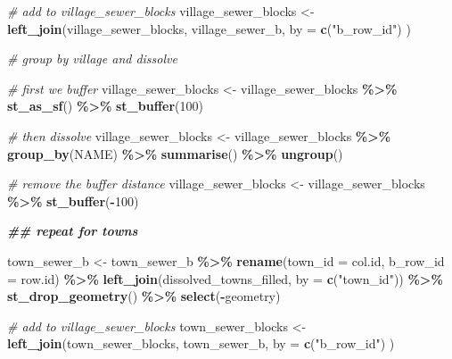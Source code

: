 \documentclass[
]{book}
\newenvironment{Shaded}{\begin{snugshade}}{\end{snugshade}}
\newcommand{\AttributeTok}[1]{\textcolor[rgb]{0.13,0.29,0.53}{#1}}
\newcommand{\CommentTok}[1]{\textcolor[rgb]{0.56,0.35,0.01}{\textit{#1}}}
\newcommand{\DecValTok}[1]{\textcolor[rgb]{0.00,0.00,0.81}{#1}}
\newcommand{\DocumentationTok}[1]{\textcolor[rgb]{0.56,0.35,0.01}{\textbf{\textit{#1}}}}
\newcommand{\FunctionTok}[1]{\textcolor[rgb]{0.13,0.29,0.53}{\textbf{#1}}}
\newcommand{\NormalTok}[1]{#1}
\newcommand{\OtherTok}[1]{\textcolor[rgb]{0.56,0.35,0.01}{#1}}
\newcommand{\SpecialCharTok}[1]{\textcolor[rgb]{0.81,0.36,0.00}{\textbf{#1}}}
\newcommand{\StringTok}[1]{\textcolor[rgb]{0.31,0.60,0.02}{#1}}
\begin{document}
\begin{Shaded}
\begin{Highlighting}[]
\CommentTok{\# add to village\_sewer\_blocks}
\NormalTok{village\_sewer\_blocks }\OtherTok{\textless{}{-}} \FunctionTok{left\_join}\NormalTok{(village\_sewer\_blocks, village\_sewer\_b, }
                                  \AttributeTok{by =} \FunctionTok{c}\NormalTok{(}\StringTok{"b\_row\_id"}\NormalTok{)}
\NormalTok{                                  )}

\CommentTok{\# group by village and dissolve}

\CommentTok{\# first we buffer}
\NormalTok{village\_sewer\_blocks }\OtherTok{\textless{}{-}}\NormalTok{ village\_sewer\_blocks }\SpecialCharTok{\%\textgreater{}\%}
  \FunctionTok{st\_as\_sf}\NormalTok{() }\SpecialCharTok{\%\textgreater{}\%}
  \FunctionTok{st\_buffer}\NormalTok{(}\DecValTok{100}\NormalTok{)}

\CommentTok{\# then dissolve}
\NormalTok{village\_sewer\_blocks }\OtherTok{\textless{}{-}}\NormalTok{ village\_sewer\_blocks }\SpecialCharTok{\%\textgreater{}\%} 
  \FunctionTok{group\_by}\NormalTok{(NAME) }\SpecialCharTok{\%\textgreater{}\%}
  \FunctionTok{summarise}\NormalTok{() }\SpecialCharTok{\%\textgreater{}\%}
  \FunctionTok{ungroup}\NormalTok{()}

\CommentTok{\# remove the buffer distance}
\NormalTok{village\_sewer\_blocks }\OtherTok{\textless{}{-}}\NormalTok{ village\_sewer\_blocks }\SpecialCharTok{\%\textgreater{}\%}
  \FunctionTok{st\_buffer}\NormalTok{(}\SpecialCharTok{{-}}\DecValTok{100}\NormalTok{)}

\DocumentationTok{\#\# repeat for towns}

\NormalTok{town\_sewer\_b }\OtherTok{\textless{}{-}}\NormalTok{ town\_sewer\_b }\SpecialCharTok{\%\textgreater{}\%}
  \FunctionTok{rename}\NormalTok{(}\AttributeTok{town\_id =}\NormalTok{ col.id,}
         \AttributeTok{b\_row\_id =}\NormalTok{ row.id) }\SpecialCharTok{\%\textgreater{}\%}
  \FunctionTok{left\_join}\NormalTok{(dissolved\_towns\_filled, }\AttributeTok{by =} \FunctionTok{c}\NormalTok{(}\StringTok{"town\_id"}\NormalTok{)) }\SpecialCharTok{\%\textgreater{}\%}
  \FunctionTok{st\_drop\_geometry}\NormalTok{() }\SpecialCharTok{\%\textgreater{}\%}
  \FunctionTok{select}\NormalTok{(}\SpecialCharTok{{-}}\NormalTok{geometry)}

\CommentTok{\# add to village\_sewer\_blocks}
\NormalTok{town\_sewer\_blocks }\OtherTok{\textless{}{-}} \FunctionTok{left\_join}\NormalTok{(town\_sewer\_blocks, town\_sewer\_b, }
                               \AttributeTok{by =} \FunctionTok{c}\NormalTok{(}\StringTok{"b\_row\_id"}\NormalTok{)}
\NormalTok{                               )}


\end{Highlighting}
\end{Shaded}
\end{document}
